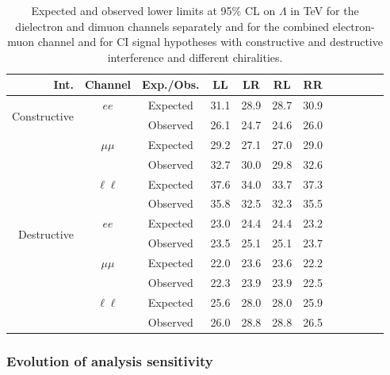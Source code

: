     \begin{table}[htp]
        \begin{center}        
        {\begin{tabular}{r c c c c c c c c c c c}\toprule
        Int. & Channel & Exp./Obs. & LL & LR & RL & RR \\
        \midrule
        \multirow{3}{*}[-1.5em]{\begin{sideways}Constructive\end{sideways}} & \multirow{2}{*}{$ee$} & Expected & 31.1 & 28.9 & 28.7 & 30.9 \\
        & & Observed & 26.1 & 24.7 & 24.6 & 26.0 \\
        \cmidrule{2-7}
         & \multirow{2}{*}{$\mu\mu$} & Expected & 29.2 & 27.1 & 27.0 & 29.0 \\
        & & Observed & 32.7 & 30.0 & 29.8 & 32.6 \\
        \cmidrule{2-7}
         & \multirow{2}{*}{$\ell\ell$} & Expected & 37.6 & 34.0 & 33.7 & 37.3 \\
        & & Observed & 35.8 & 32.5 & 32.3 & 35.5 \\
        \midrule
        \multirow{3}{*}[-1.5em]{\begin{sideways}Destructive\end{sideways}} & \multirow{2}{*}{$ee$} & Expected & 23.0 & 24.4 & 24.4 & 23.2 \\
        & & Observed & 23.5 & 25.1 & 25.1 & 23.7 \\
        \cmidrule{2-7}
         & \multirow{2}{*}{$\mu\mu$} & Expected & 22.0 & 23.6 & 23.6 & 22.2 \\
        & & Observed & 22.3 & 23.9 & 23.9 & 22.5 \\
        \cmidrule{2-7}
         & \multirow{2}{*}{$\ell\ell$} & Expected & 25.6 & 28.0 & 28.0 & 25.9 \\
        & & Observed & 26.0 & 28.8 & 28.8 & 26.5 \\
        \bottomrule\end{tabular}}
        \caption{Expected and observed lower limits at 95$\%$ CL on $\Lambda$ in TeV for the dielectron and dimuon channels separately and for the combined electron-muon channel and for CI signal hypotheses with constructive and destructive interference and different chiralities.}
        \label{tab:limits_on_lambda}
        \end{center}
    \end{table}

\subsubsection{Evolution of analysis sensitivity}

